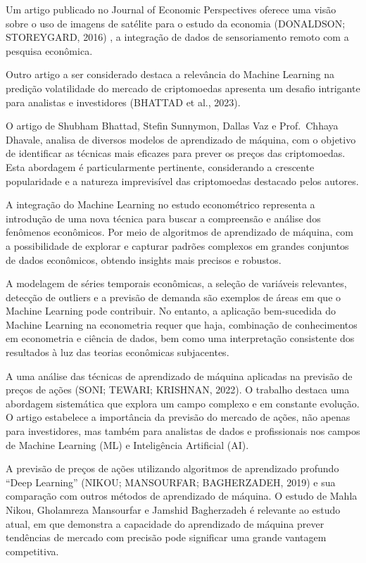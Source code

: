 \documentclass[
]{article}
\begin{document}
Um artigo publicado no Journal of Economic Perspectives oferece uma
visão sobre o uso de imagens de satélite para o estudo da economia
(DONALDSON; STOREYGARD, 2016) , a integração de dados de sensoriamento
remoto com a pesquisa econômica.

Outro artigo a ser considerado destaca a relevância do Machine Learning
na predição volatilidade do mercado de criptomoedas apresenta um desafio
intrigante para analistas e investidores (BHATTAD et al., 2023).

O artigo de Shubham Bhattad, Stefin Sunnymon, Dallas Vaz e Prof.~Chhaya
Dhavale, analisa de diversos modelos de aprendizado de máquina, com o
objetivo de identificar as técnicas mais eficazes para prever os preços
das criptomoedas. Esta abordagem é particularmente pertinente,
considerando a crescente popularidade e a natureza imprevisível das
criptomoedas destacado pelos autores.

A integração do Machine Learning no estudo econométrico representa a
introdução de uma nova técnica para buscar a compreensão e análise dos
fenômenos econômicos. Por meio de algoritmos de aprendizado de máquina,
com a possibilidade de explorar e capturar padrões complexos em grandes
conjuntos de dados econômicos, obtendo insights mais precisos e
robustos.

A modelagem de séries temporais econômicas, a seleção de variáveis
relevantes, detecção de outliers e a previsão de demanda são exemplos de
áreas em que o Machine Learning pode contribuir. No entanto, a aplicação
bem-sucedida do Machine Learning na econometria requer que haja,
combinação de conhecimentos em econometria e ciência de dados, bem como
uma interpretação consistente dos resultados à luz das teorias
econômicas subjacentes.

A uma análise das técnicas de aprendizado de máquina aplicadas na
previsão de preços de ações (SONI; TEWARI; KRISHNAN, 2022). O trabalho
destaca uma abordagem sistemática que explora um campo complexo e em
constante evolução. O artigo estabelece a importância da previsão do
mercado de ações, não apenas para investidores, mas também para
analistas de dados e profissionais nos campos de Machine Learning (ML) e
Inteligência Artificial (AI).

A previsão de preços de ações utilizando algoritmos de aprendizado
profundo ``Deep Learning'' (NIKOU; MANSOURFAR; BAGHERZADEH, 2019) e sua
comparação com outros métodos de aprendizado de máquina. O estudo de
Mahla Nikou, Gholamreza Mansourfar e Jamshid Bagherzadeh é relevante ao
estudo atual, em que demonstra a capacidade do aprendizado de máquina
prever tendências de mercado com precisão pode significar uma grande
vantagem competitiva.
\end{document}
